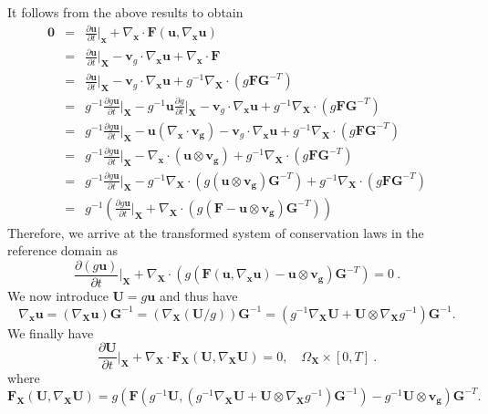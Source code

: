 \documentclass[11pt]{article}
\begin{document}
It follows from the above results to obtain
\begin{eqnarray}
\bm{0} & = &  \frac{\partial\bm{u}}{\partial t} \Big|_{\bm{x}} + \nabla_{\bm{x}} \cdot  \bm{F}(\bm{u}, \nabla_{\bm{x}}\bm{u}) \nonumber \\[1ex]
& = &  \frac{\partial\bm{u}}{\partial t} \Big|_{\bm{X}} - \bm{v}_g  \cdot \nabla_{\bm{x}} \bm{u}  + \nabla_{\bm{x}} \cdot  \bm{F}  \nonumber \\[1ex]
 & = &  \frac{\partial\bm{u}}{\partial t} \Big|_{\bm{X}} - \bm{v}_g  \cdot \nabla_{\bm{x}} \bm{u}  + g^{-1} \nabla_{\bm{X}} \cdot (g \bm{F} \bm{G}^{-T})  \nonumber \\[1ex]
  & = & g^{-1} \frac{\partial g\bm{u}}{\partial t} \Big|_{\bm{X}} - g^{-1} \bm{u} \frac{\partial g}{\partial t} \Big|_{\bm{X}} - \bm{v}_g  \cdot \nabla_{\bm{x}} \bm{u}  + g^{-1} \nabla_{\bm{X}} \cdot (g \bm{F} \bm{G}^{-T})  \nonumber \\[1ex]
  & = & g^{-1} \frac{\partial g\bm{u}}{\partial t} \Big|_{\bm{X}} -  \bm{u} ( \nabla_{\bm{x}} \cdot \bm{v}_{\bm{g}})- \bm{v}_g  \cdot \nabla_{\bm{x}} \bm{u}  + g^{-1} \nabla_{\bm{X}} \cdot (g \bm{F} \bm{G}^{-T})  \nonumber \\[1ex]
    & = & g^{-1} \frac{\partial g\bm{u}}{\partial t} \Big|_{\bm{X}} -  \nabla_{\bm{x}} \cdot  (\bm{u} \otimes \bm{v}_{\bm{g}})  + g^{-1} \nabla_{\bm{X}} \cdot (g \bm{F} \bm{G}^{-T})  \nonumber \\[1ex]
  & = & g^{-1} \frac{\partial g\bm{u}}{\partial t} \Big|_{\bm{X}} -  g^{-1} \nabla_{\bm{X}} \cdot  (g (\bm{u} \otimes \bm{v}_{\bm{g}}) \bm{G}^{-T})  + g^{-1} \nabla_{\bm{X}} \cdot (g \bm{F} \bm{G}^{-T})  \nonumber \\[1ex]
    & = & g^{-1} \left( \frac{\partial g\bm{u}}{\partial t} \Big|_{\bm{X}} + \nabla_{\bm{X}} \cdot (g (\bm{F} - \bm{u} \otimes \bm{v}_{\bm{g}}) \bm{G}^{-T})  \right)
\end{eqnarray}
Therefore, we arrive at the transformed system of conservation laws in the reference domain as
\begin{equation}
 \frac{\partial (g\bm{u})}{\partial t} \Big|_{\bm{X}} + \nabla_{\bm{X}} \cdot (g (\bm{F}(\bm{u},\nabla_{\bm{x}} \bm{u}) - \bm{u} \otimes \bm{v}_{\bm{g}}) \bm{G}^{-T})  = 0 \ .
\end{equation}
We now introduce $\bm{U} = g \bm{u}$ and thus have
\begin{equation}
\nabla_{\bm{x}} \bm{u} =  (\nabla_{\bm{X}} \bm{u}) \bm{G}^{-1} = (\nabla_{\bm{X}} (\bm{U}/g)) \bm{G}^{-1} = (g^{-1} \nabla_{\bm{X}} \bm{U} + \bm{U} \otimes \nabla_{\bm{X}} g^{-1}) \bm{G}^{-1} .
\end{equation}
We finally have 
\begin{equation}
 \frac{\partial \bm{U}}{\partial t} \Big|_{\bm{X}} + \nabla_{\bm{X}} \cdot \bm{F}_{\bm{X}} (\bm{U}, \nabla_{\bm{X}} \bm{U})  = 0, \quad \Omega_{\bm{X}} \times [0,T] \ .
\end{equation}
where
\begin{equation}
\bm{F}_{\bm{X}} (\bm{U}, \nabla_{\bm{X}} \bm{U})  = g (\bm{F}(g^{-1}\bm{U}, (g^{-1} \nabla_{\bm{X}} \bm{U} + \bm{U} \otimes \nabla_{\bm{X}} g^{-1}) \bm{G}^{-1}) - g^{-1} \bm{U} \otimes \bm{v}_{\bm{g}}) \bm{G}^{-T}  .
\end{equation}
\end{document}

